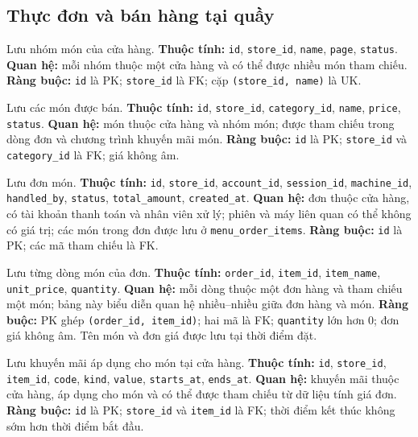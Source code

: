 \subsection{Thực đơn và bán hàng tại quầy}
\begin{description}[leftmargin=3.7cm,labelwidth=3.5cm,style=nextline]
  \item[\texttt{menu\_categories}] Lưu nhóm món của cửa hàng. \textbf{Thuộc tính:} \texttt{id}, \texttt{store\_id}, \texttt{name}, \texttt{page}, \texttt{status}. \textbf{Quan hệ:} mỗi nhóm thuộc một cửa hàng và có thể được nhiều món tham chiếu. \textbf{Ràng buộc:} \texttt{id} là PK; \texttt{store\_id} là FK; cặp \texttt{(store\_id, name)} là UK.
  \item[\texttt{menu\_items}] Lưu các món được bán. \textbf{Thuộc tính:} \texttt{id}, \texttt{store\_id}, \texttt{category\_id}, \texttt{name}, \texttt{price}, \texttt{status}. \textbf{Quan hệ:} món thuộc cửa hàng và nhóm món; được tham chiếu trong dòng đơn và chương trình khuyến mãi món. \textbf{Ràng buộc:} \texttt{id} là PK; \texttt{store\_id} và \texttt{category\_id} là FK; giá không âm.
  \item[\texttt{menu\_orders}] Lưu đơn món. \textbf{Thuộc tính:} \texttt{id}, \texttt{store\_id}, \texttt{account\_id}, \texttt{session\_id}, \texttt{machine\_id}, \texttt{handled\_by}, \texttt{status}, \texttt{total\_amount}, \texttt{created\_at}. \textbf{Quan hệ:} đơn thuộc cửa hàng, có tài khoản thanh toán và nhân viên xử lý; phiên và máy liên quan có thể không có giá trị; các món trong đơn được lưu ở \texttt{menu\_order\_items}. \textbf{Ràng buộc:} \texttt{id} là PK; các mã tham chiếu là FK.
  \item[\texttt{menu\_order\_items}] Lưu từng dòng món của đơn. \textbf{Thuộc tính:} \texttt{order\_id}, \texttt{item\_id}, \texttt{item\_name}, \texttt{unit\_price}, \texttt{quantity}. \textbf{Quan hệ:} mỗi dòng thuộc một đơn hàng và tham chiếu một món; bảng này biểu diễn quan hệ nhiều--nhiều giữa đơn hàng và món. \textbf{Ràng buộc:} PK ghép \texttt{(order\_id, item\_id)}; hai mã là FK; \texttt{quantity} lớn hơn 0; đơn giá không âm. Tên món và đơn giá được lưu tại thời điểm đặt.
  \item[\texttt{menu\_promotions}] Lưu khuyến mãi áp dụng cho món tại cửa hàng. \textbf{Thuộc tính:} \texttt{id}, \texttt{store\_id}, \texttt{item\_id}, \texttt{code}, \texttt{kind}, \texttt{value}, \texttt{starts\_at}, \texttt{ends\_at}. \textbf{Quan hệ:} khuyến mãi thuộc cửa hàng, áp dụng cho món và có thể được tham chiếu từ dữ liệu tính giá đơn. \textbf{Ràng buộc:} \texttt{id} là PK; \texttt{store\_id} và \texttt{item\_id} là FK; thời điểm kết thúc không sớm hơn thời điểm bắt đầu.

\end{description}
